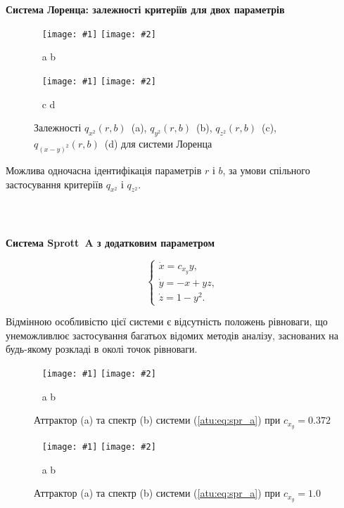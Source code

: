 \documentclass[14pt,handout,utf8]{beamer}
\newcommand{\Xhead}[1]{
 \begin{center}%
      \textbf{#1}%
 \end{center}%
}
\newcommand{\ABlbl}{%
  \vspace{-2.9ex}
  \begin{center}
    ~ \hfill a \hfill\hfill b \hfill ~
  \end{center}
  \vspace{-2.0ex}
}
\newcommand{\PicDouble}[2]{%
 \begin{center}
    ~ \hfill
    \texttt{[image: \#1]}
    \hfill
    \texttt{[image: \#2]}
    \hfill ~
  \end{center}
  \ABlbl
}
\newcommand{\PicDoubleNL}[2]{%
 \begin{center}
    ~ \hfill
    \texttt{[image: \#1]}
    \hfill
    \texttt{[image: \#2]}
    \hfill ~
  \end{center}
}
\begin{document}
\begin{frame}
  \frametitle{~}


  \Xhead{Система Лоренца: залежності критеріїв для двох параметрів}

\begin{figure}[htb!]
  \PicDouble{../p5/p/cha/lor/q2d/lor_qx2_r_b.png}{../p5/p/cha/lor/q2d/lor_qy2_r_b.png}
  \vspace{2ex}
  \PicDoubleNL{../p5/p/cha/lor/q2d/lor_qz2_r_b.png}{../p5/p/cha/lor/q2d/lor_qxmy2_r_b.png}
  \vspace{-2.7ex}
  \begin{center}
    ~ \hfill c \hfill\hfill d \hfill ~
  \end{center}
  \vspace{-1.5ex}
  \caption{Залежності $q_{x^2}(r,b)$~(a), $q_{y^2}(r,b)$~(b), $q_{z^2}(r,b)$~(c), $q_{(x-y)^2}(r,b)$~(d) для системи Лоренца}
  \label{atu:f:lor_q_r_b}
\end{figure}

  Можлива одночасна ідентифікація параметрів
  $r$ і
  $b$, за умови спільного застосування критеріїв
  $q_{x^2}$ і
  $q_{z^2}$.

\end{frame}



\begin{frame}
  \frametitle{~}

  \Xhead{Система Sprott~A з додатковим параметром}

  \begin{equation}
    \begin{cases}
      \dot{x} =  c_{x_y} y, \\
      \dot{y} = -x + yz, \\
      \dot{z} =  1 - y^2.
    \end{cases}
    \label{atu:eq:spr_a}
  \end{equation}

Відмінною особливістю цієї системи є відсутність положень рівноваги, що унеможливлює
застосування багатьох відомих методів аналізу, заснованих на будь-якому
розкладі в околі точок рівноваги.

  \begin{figure}
    \PicDouble{../p5/p/cha/spr_a/sprott_a-p_xyz_cx_y=0x372.png}{../p5/p/cha/spr_a/sprott_a_f-p_f_cx_y=0x372.png}
    \caption{Аттрактор (a) та спектр (b) системи (\ref{atu:eq:spr_a}) при $c_{x_y} =0.372$}
    \label{atu:f:spr_a_p_0372}
  \end{figure}

  \begin{figure}[htb!]
    \PicDouble{../p5/p/cha/spr_a/sprott_a-p_xyz_cx_y=1x000.png}{../p5/p/cha/spr_a/sprott_a_f-p_f_cx_y=1x000.png}
    \caption{Аттрактор (a) та спектр (b) системи (\ref{atu:eq:spr_a}) при $c_{x_y} =1.0$}
    \label{atu:f:spr_a_p_1000}
  \end{figure}

\end{frame}
\end{document}
